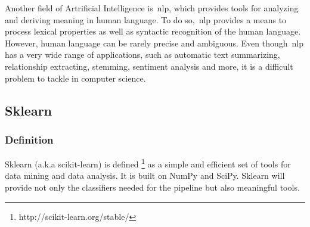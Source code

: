 Another field of Artrificial Intelligence is~\ac{nlp}, which provides tools for analyzing and deriving meaning in human language. To do so,~\ac{nlp} provides a means to process lexical properties as well as syntactic recognition of the human language. However, human language can be rarely precise and ambiguous. Even though~\ac{nlp} has a very wide range of applications, such as automatic text summarizing, relationship extracting, stemming, sentiment analysis and more, it is a difficult problem to tackle in computer science.

\subsection{Sklearn}
\subsubsection{Definition}
Sklearn (a.k.a scikit-learn) is defined \footnote{http://scikit-learn.org/stable/} as a simple and efficient set of tools for data mining and data analysis. It is built on NumPy and SciPy. Sklearn will provide not only the classifiers needed for the pipeline but also meaningful tools.
